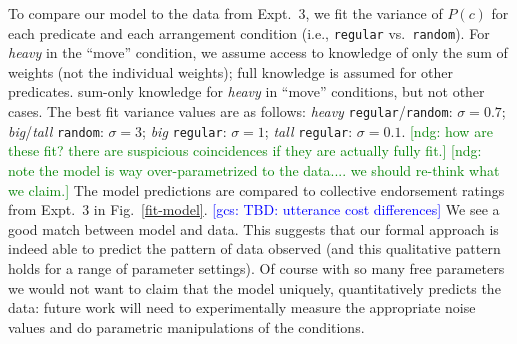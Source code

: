 \documentclass[preprint,12pt,authoryear,titlepage]{elsarticle}
\newcommand{\ndg}[1]{\textcolor{Green}{[ndg: #1]}}
\newcommand{\gcs}[1]{\textcolor{blue}{[gcs: #1]}}
\begin{document}



To compare our model to the data from Expt.~3, we fit the variance of $P(c)$ for each predicate and each arrangement condition (i.e., \texttt{regular} vs.~\texttt{random}). For \emph{heavy} in the ``move'' condition, we assume access to knowledge of only the sum of weights (not the individual weights); full knowledge is assumed for other predicates.
sum-only knowledge for \emph{heavy} in ``move'' conditions, but not other cases. The best fit variance values are as follows: \emph{heavy} \texttt{regular}/\texttt{random}: $\sigma=0.7$; \emph{big}/\emph{tall} \texttt{random}: $\sigma=3$; \emph{big} \texttt{regular}: $\sigma=1$; \emph{tall} \texttt{regular}: $\sigma=0.1$. 
\ndg{how are these fit? there are suspicious coincidences if they are actually fully fit.} 
\ndg{note the model is way over-parametrized to the data.... we should re-think what we claim.}
The model predictions are compared to collective endorsement ratings from Expt.~3 in Fig.~\ref{fit-model}. \gcs{TBD: utterance cost differences}
We see a good match between model and data.
This suggests that our formal approach is indeed able to predict the pattern of data observed (and this qualitative pattern holds for a range of parameter settings). 
Of course with so many free parameters we would not want to claim that the model uniquely, quantitatively predicts the data: future work will need to experimentally measure the appropriate noise values and do parametric manipulations of the conditions.
\end{document}
